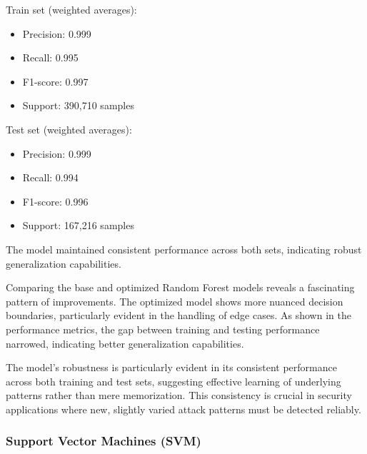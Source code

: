 \begin{itemize}
                    Train set (weighted averages):
                    
                    \begin{itemize}
                        \item Precision: 0.999
                        \item Recall: 0.995
                        \item F1-score: 0.997
                        \item Support: 390,710 samples
                    \end{itemize}

                    Test set (weighted averages):
                    
                    \begin{itemize}
                        \item Precision: 0.999
                        \item Recall: 0.994
                        \item F1-score: 0.996
                        \item Support: 167,216 samples
                    \end{itemize}

                    The model maintained consistent performance across both sets, indicating robust generalization capabilities.

                    
                    Comparing the base and optimized Random Forest models reveals a fascinating pattern of improvements. The optimized model shows more nuanced decision boundaries, particularly evident in the handling of edge cases. As shown in the performance metrics, the gap between training and testing performance narrowed, indicating better generalization capabilities.
            
                    The model's robustness is particularly evident in its consistent performance across both training and test sets, suggesting effective learning of underlying patterns rather than mere memorization. This consistency is crucial in security applications where new, slightly varied attack patterns must be detected reliably.
                    
                
            \end{itemize}

        \subsubsection{Support Vector Machines (SVM)}
        
